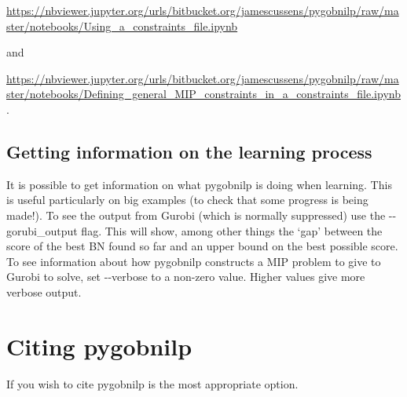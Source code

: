 \documentclass{article}
\newcommand{\pygobnilp}{\textsf{pygobnilp}}
\begin{document}
\url{https://nbviewer.jupyter.org/urls/bitbucket.org/jamescussens/pygobnilp/raw/master/notebooks/Using_a_constraints_file.ipynb}

and

\url{https://nbviewer.jupyter.org/urls/bitbucket.org/jamescussens/pygobnilp/raw/master/notebooks/Defining_general_MIP_constraints_in_a_constraints_file.ipynb}.

\subsection{Getting information on the learning process}
\label{sec:info}

It is possible to get information on what \pygobnilp{} is doing when
learning. This is useful particularly on big examples (to check that
some progress is being made!). To see the output from Gurobi (which is
normally suppressed) use the -{}-gorubi\_output flag. This will show,
among other things the `gap' between the score of the best BN found so
far and an upper bound on the best possible score. To see information
about how \pygobnilp{} constructs a MIP problem to give to Gurobi to
solve, set -{}-verbose to a non-zero value. Higher values give more
verbose output.

\section{Citing \pygobnilp}
\label{sec:citing}

If you wish to cite \pygobnilp{}
\citet{cussens11:_bayes_networ_learn_cuttin_planes} is the most
appropriate option.



\end{document}
